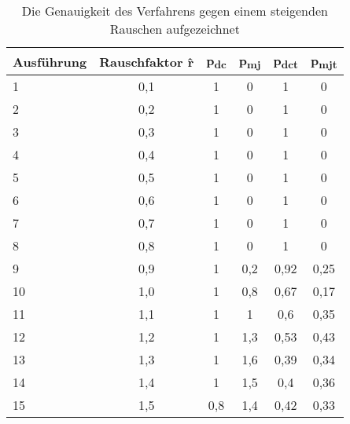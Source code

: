 \begin{table}[t]
	\centering
	\begin{tabular}[width=\textwidth]{l *{5}{c}}
		\hline
		\textbf{Ausführung} & \textbf{Rauschfaktor \^{r}} & \textbf{p\textsubscript{dc}} & \textbf{p\textsubscript{mj}} & \textbf{p\textsubscript{dct}} & \textbf{p\textsubscript{mjt}} \\
		\hline
		1 & 0,1 & 1 & 0 & 1 & 0 \\
		2 & 0,2 & 1 & 0 & 1 & 0 \\
		3 & 0,3 & 1 & 0 & 1 & 0 \\
		4 & 0,4 & 1 & 0 & 1 & 0 \\
		5 & 0,5 & 1 & 0 & 1 & 0 \\
		6 & 0,6 & 1 & 0 & 1 & 0 \\
		7 & 0,7 & 1 & 0 & 1 & 0 \\
		8 & 0,8 & 1 & 0 & 1 & 0 \\
		9 & 0,9 & 1 & 0,2 & 0,92 & 0,25 \\
		10 & 1,0 & 1 & 0,8 & 0,67 & 0,17 \\
		11 & 1,1 & 1 & 1 & 0,6 & 0,35 \\
		12 & 1,2 & 1 & 1,3 & 0,53 & 0,43 \\
		13 & 1,3 & 1 & 1,6 & 0,39 & 0,34 \\
		14 & 1,4 & 1 & 1,5 & 0,4 & 0,36 \\
		15 & 1,5 & 0,8 & 1,4 & 0,42 & 0,33 \\
		\hline
	\end{tabular}
	\caption[Ergebnisse der Untersuchung des Rauschens auf die Genauigkeit]{Die Genauigkeit des Verfahrens gegen einem steigenden Rauschen aufgezeichnet}
	\label{table: point_distortion_results}
\end{table}

